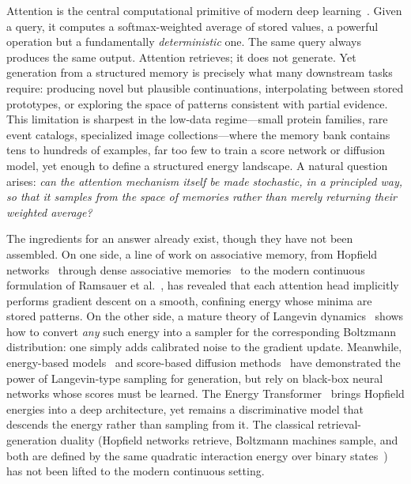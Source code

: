 
Attention is the central computational primitive of modern deep learning~\cite{vaswaniAttentionAllYou2017}. Given a query, it computes a softmax-weighted average of stored values, a powerful operation but a fundamentally \emph{deterministic} one. The same query always produces the same output. Attention retrieves; it does not generate. Yet generation from a structured memory is precisely what many downstream tasks require: producing novel but plausible continuations, interpolating between stored prototypes, or exploring the space of patterns consistent with partial evidence. This limitation is sharpest in the low-data regime---small protein families, rare event catalogs, specialized image collections---where the memory bank contains tens to hundreds of examples, far too few to train a score network or diffusion model, yet enough to define a structured energy landscape. A natural question arises: \emph{can the attention mechanism itself be made stochastic, in a principled way, so that it samples from the space of memories rather than merely returning their weighted average?}

The ingredients for an answer already exist, though they have not been assembled. On one side, a line of work on associative memory, from Hopfield networks~\cite{hopfieldNeuralNetworksPhysical1982} through dense associative memories~\cite{krotovDenseAssociativeMemory2016,krotovLargeAssociativeMemory2021} to the modern continuous formulation of Ramsauer et al.~\cite{ramsauerHopfieldNetworksAll2021}, has revealed that each attention head implicitly performs gradient descent on a smooth, confining energy whose minima are stored patterns. On the other side, a mature theory of Langevin dynamics~\cite{robertsTweedieExponentialConvergence1996,wellingBayesianLearningStochastic2011,durmusNonasymptoticAnalysisUnadjusted2017} shows how to convert \emph{any} such energy into a sampler for the corresponding Boltzmann distribution: one simply adds calibrated noise to the gradient update. Meanwhile, energy-based models~\cite{lecunTutorialEnergyBased2006,songHowTrainEnergyBased2021} and score-based diffusion methods~\cite{songGenerativeModelingEstimating2019,songScoreBasedGenerativeModeling2021} have demonstrated the power of Langevin-type sampling for generation, but rely on black-box neural networks whose scores must be learned. The Energy Transformer~\cite{hooverEnergyTransformer2024} brings Hopfield energies into a deep architecture, yet remains a discriminative model that descends the energy rather than sampling from it. The classical retrieval-generation duality (Hopfield networks retrieve, Boltzmann machines sample, and both are defined by the same quadratic interaction energy over binary states~\cite{ackeleyLearningAlgorithmBoltzmann1985}) has not been lifted to the modern continuous setting.

